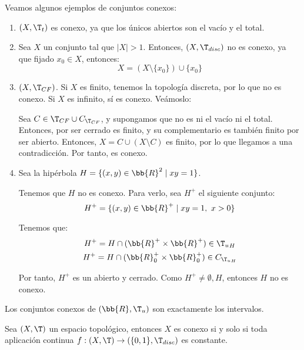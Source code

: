 \begin{ejemplo}
    Veamos algunos ejemplos de conjuntos conexos:
    \begin{enumerate}
        \item $(X,\T_t)$ es conexo, ya que los únicos abiertos son el vacío y el total.

        \item Sea $X$ un conjunto tal que $|X|>1$. Entonces, $(X,\T_{disc})$ no es conexo, ya que fijado $x_0\in X$, entonces:
        \begin{equation*}
            X = (X\setminus \{x_0\})\cup \{x_0\}
        \end{equation*}

        \item $(X,\T_{CF})$. Si $X$ es finito, tenemos la topología discreta, por lo que no es conexo. Si $X$ es infinito, sí es conexo. Veámoslo:

        Sea $C\in \T_{CF}\cup C_{\T_{CF}}$, y supongamos que no es ni el vacío ni el total. Entonces, por ser cerrado es finito, y su complementario es también finito por ser abierto. Entonces, $X=C\cup (X\setminus C)$ es finito, por lo que llegamos a una contradicción. Por tanto, es conexo.

        \item Sea la hipérbola $H=\{(x,y)\in \bb{R}^2\mid xy=1\}$.

        Tenemos que $H$ no es conexo. Para verlo, sea $H^+$ el siguiente conjunto:
        \begin{equation*}
            H^+ = \{(x,y)\in \bb{R}^+\mid xy=1,~ x>0\}
        \end{equation*}

        Tenemos que:
        \begin{gather*}
            H^+ = H\cap (\bb{R}^+\times \bb{R}^+)\in {\T_u}_H\\
            H^+ = H\cap (\bb{R}^+_0\times \bb{R}^+_0)\in C_{{\T_u}_H}
        \end{gather*}

        Por tanto, $H^+$ es un abierto y cerrado. Como $H^+\neq \emptyset, H$, entonces $H$ no es conexo.
    \end{enumerate}
\end{ejemplo}

\begin{prop}
    Los conjuntos conexos de $(\bb{R}, \T_u)$ son exactamente los intervalos.
\end{prop}

\begin{lema}
    Sea $(X,\T)$ un espacio topológico, entonces $X$ es conexo si y solo si toda aplicación continua $f:(X,\T)\to \left(\{0,1\},\T_{disc}\right)$ es constante.
\end{lema}

